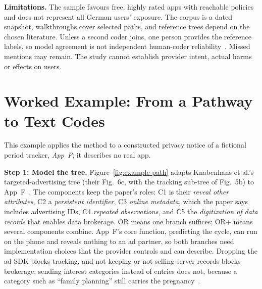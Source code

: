 \documentclass[sigconf,nonacm,natbib=false]{acmart}
\begin{document}
\textbf{Limitations.} The sample favours free, highly rated apps with reachable
policies and does not represent all German users' exposure. The corpus is a
dated snapshot, walkthroughs cover selected paths, and reference trees depend
on the chosen literature. Unless a second coder joins, one person provides the
reference labels, so model agreement is not independent human-coder
reliability~\parencite{mcdonald2019reliability}. Missed mentions may remain.
The study cannot establish provider intent, actual harms or effects on users.

\clearpage
\balance
\printbibliography[title={References}]

\onecolumn
\appendix
\section{Worked Example: From a Pathway to Text Codes}
\label{app:example}

This example applies the method to a constructed privacy notice of a
fictional period tracker, \emph{App~F}; it describes no real app.

\textbf{Step 1: Model the tree.} Figure~\ref{fig:example-path} adapts
Knabenhans et al.'s targeted-advertising tree (their Fig.~6c, with the
tracking sub-tree of Fig.~5b) to App~F~\parencite[\S4.2]{knabenhans2026harms}.
The components keep the paper's roles: C1 is their \emph{reveal other
attributes}, C2 a \emph{persistent identifier}, C3 \emph{online metadata},
which the paper says includes advertising IDs, C4 \emph{repeated
observations}, and C5 the \emph{digitization of data records} that enables
data brokerage. OR means one branch suffices; OR+ means several components
combine. App~F's core function, predicting the cycle, can run on the phone and
reveals nothing to an ad partner, so both branches need implementation
choices that the provider controls and can describe. Dropping the ad SDK
blocks tracking, and not keeping or not selling server records blocks
brokerage; sending interest categories instead of entries does not, because a
category such as \enquote{family planning} still carries the
pregnancy~\parencite{martin2025cookies}.
\end{document}
